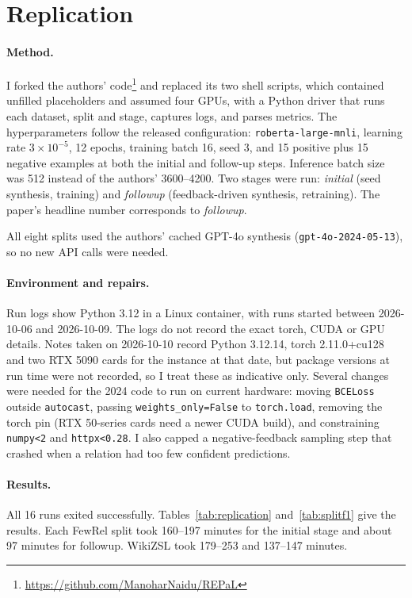 \section{Replication}
\label{sec:replication}

\paragraph{Method.} I forked the authors' code\footnote{\url{https://github.com/ManoharNaidu/REPaL}} and replaced its two shell scripts, which contained unfilled placeholders and assumed four GPUs, with a Python driver that runs each dataset, split and stage, captures logs, and parses metrics. The hyperparameters follow the released configuration: \texttt{roberta-large-mnli}, learning rate $3\times10^{-5}$, 12 epochs, training batch 16, seed 3, and 15 positive plus 15 negative examples at both the initial and follow-up steps. Inference batch size was 512 instead of the authors' 3600--4200. Two stages were run: \emph{initial} (seed synthesis, training) and \emph{followup} (feedback-driven synthesis, retraining). The paper's headline number corresponds to \emph{followup}.

All eight splits used the authors' cached GPT-4o synthesis (\texttt{gpt-4o-2024-05-13}), so no new API calls were needed.

\paragraph{Environment and repairs.} Run logs show Python 3.12 in a Linux container, with runs started between 2026-10-06 and 2026-10-09. The logs do not record the exact torch, CUDA or GPU details. Notes taken on 2026-10-10 record Python 3.12.14, torch 2.11.0+cu128 and two RTX 5090 cards for the instance at that date, but package versions at run time were not recorded, so I treat these as indicative only. Several changes were needed for the 2024 code to run on current hardware: moving \texttt{BCELoss} outside \texttt{autocast}, passing \texttt{weights\_only=False} to \texttt{torch.load}, removing the torch pin (RTX 50-series cards need a newer CUDA build), and constraining \texttt{numpy<2} and \texttt{httpx<0.28}. I also capped a negative-feedback sampling step that crashed when a relation had too few confident predictions.

\paragraph{Results.} All 16 runs exited successfully. Tables~\ref{tab:replication} and~\ref{tab:splitf1} give the results. Each FewRel split took 160--197 minutes for the initial stage and about 97 minutes for followup. WikiZSL took 179--253 and 137--147 minutes.


